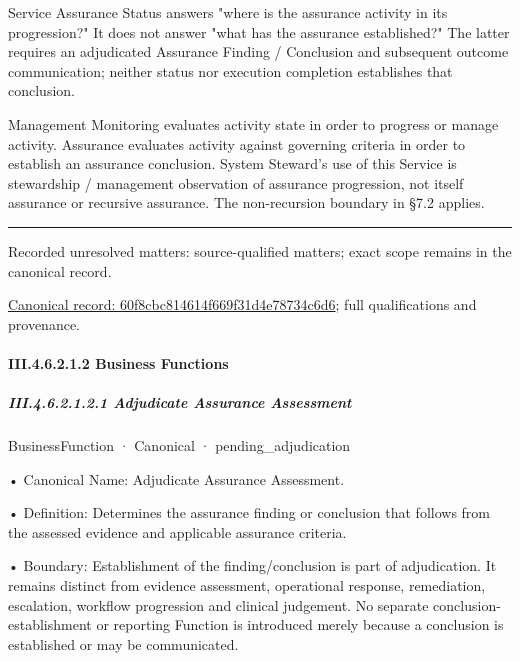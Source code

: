 Service Assurance Status answers "where is the assurance activity in its progression?" It does not answer "what has the assurance established?" The latter requires an adjudicated Assurance Finding / Conclusion and subsequent outcome communication; neither status nor execution completion establishes that conclusion.



Management Monitoring evaluates activity state in order to progress or manage activity. Assurance evaluates activity against governing criteria in order to establish an assurance conclusion. System Steward's use of this Service is stewardship / management observation of assurance progression, not itself assurance or recursive assurance. The non-recursion boundary in §7.2 applies.



\medskip\hrule\medskip

{\small Recorded unresolved matters: source-qualified matters; exact scope remains in the canonical record.}\par
{\footnotesize \href{../../../../continuum/business/business-service/60f8cbc814614f669f31d4e78734c6d6.md}{Canonical record: 60f8cbc814614f669f31d4e78734c6d6}; full qualifications and provenance.}\par
\paragraph*{III.4.6.2.1.2 Business Functions}
\label{navigation:III.4.6.2.1.2}

\subparagraph*{III.4.6.2.1.2.1 Adjudicate Assurance Assessment}
\label{navigation:III.4.6.2.1.2.1}

\label{element:7d7cd216415d4b839ea3edfbf1538110}
{\small BusinessFunction · Canonical · pending\_adjudication}\par

•
Canonical Name: Adjudicate Assurance Assessment.



•
Definition: Determines the assurance finding or conclusion that follows from the assessed evidence and applicable assurance criteria.



•
Boundary: Establishment of the finding/conclusion is part of adjudication. It remains distinct from evidence assessment, operational response, remediation, escalation, workflow progression and clinical judgement. No separate conclusion-establishment or reporting Function is introduced merely because a conclusion is established or may be communicated.



